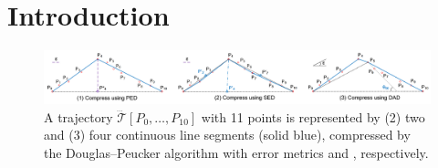 \section{Introduction}
\label{sec-intro}

\begin{figure}[tb!]
	\centering
	\includegraphics[scale=0.60]{Figures/Fig-DP.png}
	\vspace{-6ex}
	\caption{\small A trajectory $\dddot{\mathcal{T}}[P_0, \ldots, P_{10}]$  with 11 points is represented by (2) two and (3) four continuous line segments (solid blue), compressed by the Douglas--Peucker algorithm \cite{Douglas:Peucker} with error metrics \ped and \sed, respectively.}
	\vspace{-3ex}
	\label{fig:notations}
\end{figure}

